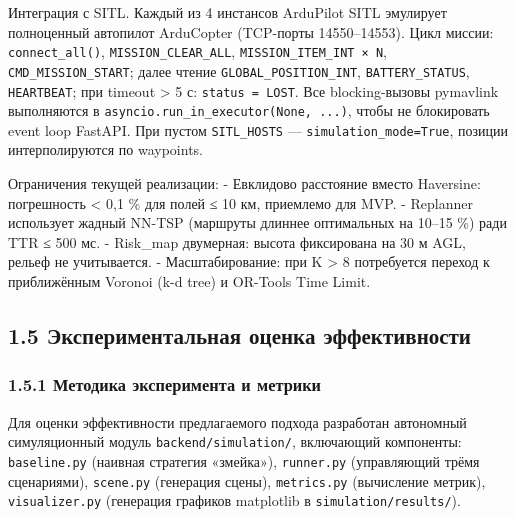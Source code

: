 \documentclass[14pt,a4paper]{extarticle}
\begin{document}
Интеграция с SITL. Каждый из 4 инстансов ArduPilot SITL эмулирует полноценный автопилот ArduCopter (TCP-порты 14550--14553). Цикл миссии: \texttt{connect\_all()}, \texttt{MISSION\_CLEAR\_ALL}, \texttt{MISSION\_ITEM\_INT\ ×\ N}, \texttt{CMD\_MISSION\_START}; далее чтение \texttt{GLOBAL\_POSITION\_INT}, \texttt{BATTERY\_STATUS}, \texttt{HEARTBEAT}; при timeout \textgreater{} 5 с: \texttt{status\ =\ LOST}. Все blocking-вызовы pymavlink выполняются в \texttt{asyncio.run\_in\_executor(None,\ ...)}, чтобы не блокировать event loop FastAPI. При пустом \texttt{SITL\_HOSTS} --- \texttt{simulation\_mode=True}, позиции интерполируются по waypoints.

Ограничения текущей реализации: - Евклидово расстояние вместо Haversine: погрешность \textless{} 0,1 \% для полей ≤ 10 км, приемлемо для MVP. - Replanner использует жадный NN-TSP (маршруты длиннее оптимальных на 10--15 \%) ради TTR ≤ 500 мс. - Risk\_map двумерная: высота фиксирована на 30 м AGL, рельеф не учитывается. - Масштабирование: при K \textgreater{} 8 потребуется переход к приближённым Voronoi (k-d tree) и OR-Tools Time Limit.


\hypertarget{ux44dux43aux441ux43fux435ux440ux438ux43cux435ux43dux442ux430ux43bux44cux43dux430ux44f-ux43eux446ux435ux43dux43aux430-ux44dux444ux444ux435ux43aux442ux438ux432ux43dux43eux441ux442ux438}{%
\subsection{1.5 Экспериментальная оценка эффективности}\label{ux44dux43aux441ux43fux435ux440ux438ux43cux435ux43dux442ux430ux43bux44cux43dux430ux44f-ux43eux446ux435ux43dux43aux430-ux44dux444ux444ux435ux43aux442ux438ux432ux43dux43eux441ux442ux438}}

\hypertarget{ux43cux435ux442ux43eux434ux438ux43aux430-ux44dux43aux441ux43fux435ux440ux438ux43cux435ux43dux442ux430-ux438-ux43cux435ux442ux440ux438ux43aux438}{%
\subsubsection{1.5.1 Методика эксперимента и метрики}\label{ux43cux435ux442ux43eux434ux438ux43aux430-ux44dux43aux441ux43fux435ux440ux438ux43cux435ux43dux442ux430-ux438-ux43cux435ux442ux440ux438ux43aux438}}

Для оценки эффективности предлагаемого подхода разработан автономный симуляционный модуль \texttt{backend/simulation/}, включающий компоненты: \texttt{baseline.py} (наивная стратегия «змейка»), \texttt{runner.py} (управляющий трёмя сценариями), \texttt{scene.py} (генерация сцены), \texttt{metrics.py} (вычисление метрик), \texttt{visualizer.py} (генерация графиков matplotlib в \texttt{simulation/results/}).
\end{document}
